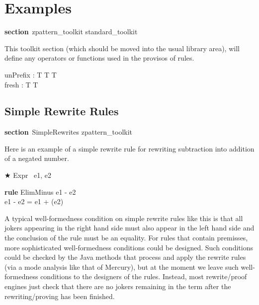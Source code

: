 \documentclass{article}
\newenvironment{zsection}{\begin{zed}}{\end{zed}}
\newcommand{\SECTION}{\textbf{section}~}
\newcommand{\parents}{\mathrel{\textbf{parents}}}
\newenvironment{zedrule}[1]{\par\textbf{rule }#1\vspace{-2ex}\infrule}{\endinfrule}
\newcommand{\derives}{\derive{}}
\newenvironment{zedjoker}[1]{\par$\bigstar$ #1\ }{}
\newcommand{\HasType}{\mathbin{:}} %
\newcommand{\negate}{\mathop{-}}
\newcommand{\arithmos}{{A\!\!\!\!A}}   %
\newcommand{\proviso}{\raisebox{0.5ex}{${}_{\blacktriangleright}\ $}}%
\begin{document}
\section{Examples}

\begin{zsection}
  \SECTION zpattern\_toolkit \parents standard\_toolkit
\end{zsection}

This toolkit section (which should be moved into the usual
library area), will define any operators or functions used
in the provisos of rules.

\begin{gendef}[T]
  unPrefix : T \cross T \fun T \\
  fresh : T \fun T
\end{gendef}



\subsection{Simple Rewrite Rules}

\begin{zsection}
  \SECTION SimpleRewrites \parents zpattern\_toolkit
\end{zsection}

Here is an example of a simple rewrite rule
for rewriting subtraction into addition of a negated number.
\begin{zedjoker}{Expr} e1, e2 \end{zedjoker} \\
\begin{zedrule}{ElimMinus}
  \proviso e1 - e2 \HasType \arithmos \\
\derives
  e1 - e2 = e1 + (\negate e2)
\end{zedrule}

A typical well-formedness condition on simple rewrite rules like this
is that all jokers appearing in the right hand side must also
appear in the left hand side and the conclusion of the rule
must be an equality.  For rules that contain premisses, more 
sophisticated well-formedness conditions could be designed. 
Such conditions could be checked by the
Java methods that process and apply the rewrite rules (via a mode
analysis like that of Mercury), but at the moment we leave such
well-formedness conditions to the designers of the rules.
Instead, most rewrite/proof engines just check that there are no
jokers remaining in the term after the rewriting/proving has been
finished.
\end{document}
